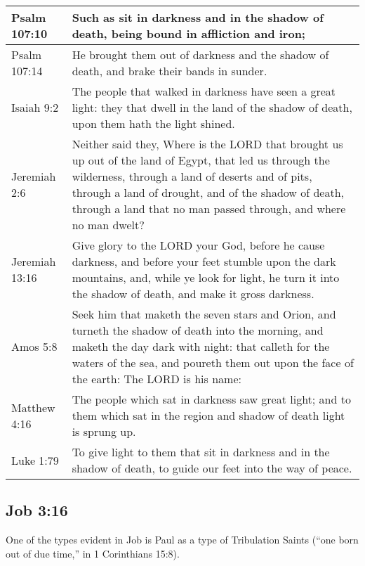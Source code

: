 \begin{center}
\begin{longtable}{p{1in}|p{3.50in}}
Psalm 107:10 & Such as sit in darkness and in the shadow of death, being bound in affliction and iron;\\ \hline
Psalm 107:14 & He brought them out of darkness and the shadow of death, and brake their bands in sunder.\\ \hline
Isaiah 9:2 & The people that walked in darkness have seen a great light: they that dwell in the land of the shadow of death, upon them hath the light shined. \\ \hline
Jeremiah 2:6 & Neither said they, Where is the LORD that brought us up out of the land of Egypt, that led us through the wilderness, through a land of deserts and of pits, through a land of drought, and of the shadow of death, through a land that no man passed through, and where no man dwelt? \\ \hline
Jeremiah 13:16 & Give glory to the LORD your God, before he cause darkness, and before your feet stumble upon the dark mountains, and, while ye look for light, he turn it into the shadow of death, and make it gross darkness. \\ \hline
Amos 5:8 & Seek him that maketh the seven stars and Orion, and turneth the shadow of death into the morning, and maketh the day dark with night: that calleth for the waters of the sea, and poureth them out upon the face of the earth: The LORD is his name: \\ \hline
Matthew 4:16 & The people which sat in darkness saw great light; and to them which sat in the region and shadow of death light is sprung up.\\ \hline
Luke 1:79 & To give light to them that sit in darkness and in the shadow of death, to guide our feet into the way of peace. \\ \hline
\end{longtable}
\end{center}





\subsection{Job 3:16}
One of the types evident in Job is Paul as a type of Tribulation Saints (``one born out of due time,'' in 1 Corinthians 15:8).

